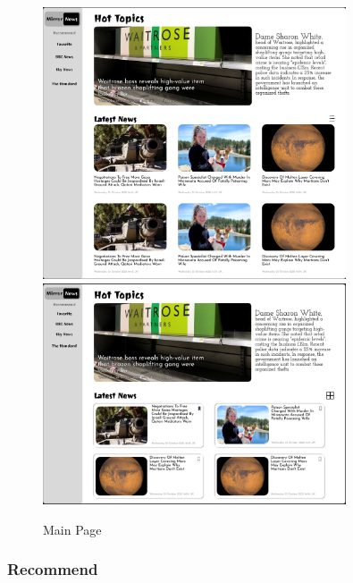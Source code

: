 \documentclass[a4paper]{article}
\begin{document}
\begin{figure}[H] %
	\centering %
	\includegraphics[width=0.8\textwidth]{./images/Main Page.png} %
	\includegraphics[width=0.8\textwidth]{./images/Main Page 2.png} %
	\caption*{Main Page} %
	\label{Fig.Main Page} %
\end{figure}

\subsubsection{Recommend}
\end{document}
